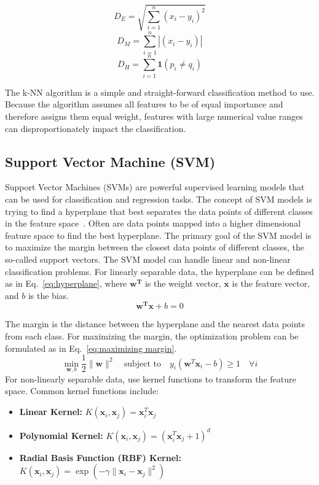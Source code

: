 \begin{equation}
    D_E = \sqrt{\sum_{i=1}^n (x_i - y_i)^2}
    \label{eq:euclidean}
\end{equation}
\begin{equation}
    D_M = \sum_{i=1}^n |(x_i - y_i)|
    \label{eq:manhattan}
\end{equation}
\begin{equation}
    D_H = \sum_{i=1}^n \mathbf{1}(p_i \neq q_i)
    \label{eq:hamming}
\end{equation}

The k-NN algorithm is a simple and straight-forward classification method to use. Because the algorithm assumes all features to be of equal importance and therefore assigns them equal weight, features with large numerical value ranges can disproportionately impact the classification. 


\subsection{Support Vector Machine (SVM)}

Support Vector Machines (SVMs) are powerful supervised learning models that can be used for classification and regression tasks. The concept of SVM models is trying to find a hyperplane that best separates the data points of different classes in the feature space~\cite{suykens_least_1999}. Often are data points mapped into a higher dimensional feature space to find the best hyperplane. The primary goal of the SVM model is to maximize the margin between the closest data points of different classes, the so-called support vectors. The SVM model can handle linear and non-linear classification problems. For linearly separable data, the hyperplane can be defined as in Eq.~\ref{eq:hyperplane}, where $\mathbf{w^T}$ is the weight vector, $\mathbf{x}$ is the feature vector, and $b$ is the bias.
\begin{equation}
    \mathbf{w^Tx}+b = 0
    \label{eq:hyperplane}
\end{equation}

The margin is the distance between the hyperplane and the nearest data points from each class. For maximizing the margin, the optimization problem can be formulated as in Eq.~\ref{eq:maximizing margin}.
\begin{equation}
    \min_{\mathbf{w}, b} \frac{1}{2} \|\mathbf{w}\|^2 \quad \text{subject to} \quad y_i (\mathbf{w}^T\mathbf{x}_i - b) \geq 1 \quad \forall i
    \label{eq:maximizing margin}
    \end{equation}
For non-linearly separable data, use kernel functions to transform the feature space. Common kernel functions include:
    \begin{itemize}
        \item \textbf{Linear Kernel:} $K(\mathbf{x}_i, \mathbf{x}_j) = \mathbf{x}_i^T\mathbf{x}_j$
        \item \textbf{Polynomial Kernel:} $K(\mathbf{x}_i, \mathbf{x}_j) = (\mathbf{x}_i^T \mathbf{x}_j + 1)^d$
        \item \textbf{Radial Basis Function (RBF) Kernel:} $K(\mathbf{x}_i, \mathbf{x}_j) = \exp(-\gamma \|\mathbf{x}_i - \mathbf{x}_j\|^2)$
    \end{itemize}

